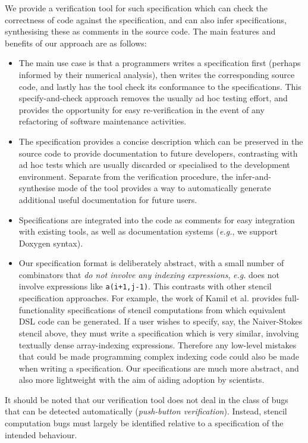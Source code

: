 \documentclass{article}
\newcommand{\eg}{\emph{e.g.}}
\begin{document}
We provide a verification tool for such specification which can check
the correctness of code against the specification, and can also infer
specifications, synthesising these as comments in the
source code. The main features and benefits of our approach are as follows:
%
\begin{itemize}
\item The main use case is that a programmers writes a specification
  first (perhaps informed by their numerical analysis), then writes
  the corresponding source code, and lastly has the tool check its
  conformance to the specifications. This specify-and-check approach
  removes the usually ad hoc testing effort, and provides the
  opportunity for easy re-verification in the event of any refactoring
  of software maintenance activities.
%
\item The specification provides a concise description which can be
  preserved in the source code to provide documentation to future
  developers, contrasting with ad hoc tests which are usually
  discarded or specialised to the development environment. Separate from the
  verification procedure, the infer-and-synthesise mode of the tool
  provides a way to automatically generate additional useful
  documentation for future users.
%
\item Specifications are integrated into the code as comments for easy
integration with existing tools, as well as
  documentation systems (\eg{}, we support Doxygen syntax).
%
\item Our specification format is deliberately abstract, with a small
  number of combinators that \emph{do not involve any indexing
    expressions}, \eg{} does not involve expressions like
  \texttt{a(i+1,j-1)}. This contrasts with other stencil specification
  approaches. For example, the work of Kamil et al. provides
  full-functionality specifications of stencil computations from which
  equivalent DSL code can be generated.  If a user wishes to specify,
  say, the Naiver-Stokes stencil above, they must write a
  specification which is very similar, involving textually dense
  array-indexing expressions. Therefore any low-level mistakes that
  could be made programming complex indexing code could also be made
  when writing a specification. Our specifications are much more
  abstract, and also more lightweight with the aim of aiding adoption
  by scientists.
\end{itemize}

It should be noted that our verification tool does not deal in the
class of bugs that can be detected automatically (\emph{push-button
  verification}). Instead, stencil computation bugs must largely be
identified relative to a specification of the intended behaviour.
\end{document}

